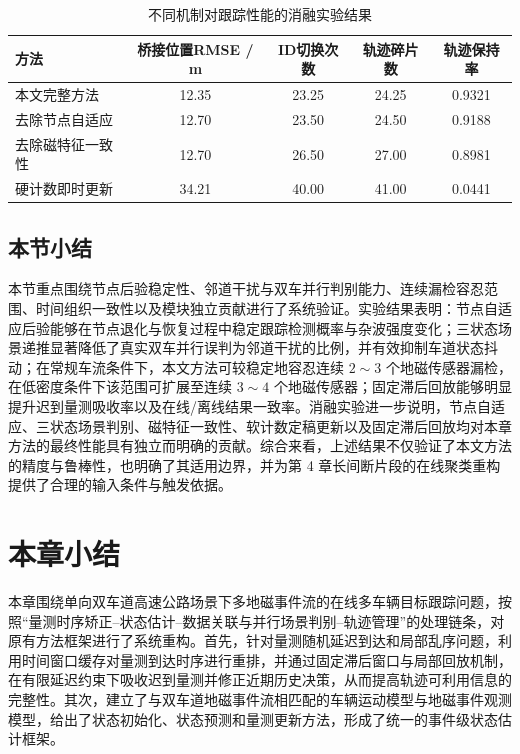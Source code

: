 \documentclass{xdupgthesis}
\begin{document}
\begin{table}[htbp]
	\centering
	\caption{不同机制对跟踪性能的消融实验结果}
	\label{tab:ablation_tracking}
	\begin{tabular}{lcccc}
		\toprule
		方法 & 桥接位置RMSE / m & ID切换次数 & 轨迹碎片数 & 轨迹保持率 \\
		\midrule
		本文完整方法      & 12.35 & 23.25 & 24.25 & 0.9321 \\
		去除节点自适应    & 12.70 & 23.50 & 24.50 & 0.9188 \\
		去除磁特征一致性    & 12.70 & 26.50 & 27.00 & 0.8981 \\
		硬计数即时更新    & 34.21 & 40.00 & 41.00 & 0.0441 \\
		\bottomrule
	\end{tabular}
\end{table}


\subsection{本节小结}

本节重点围绕节点后验稳定性、邻道干扰与双车并行判别能力、连续漏检容忍范围、时间组织一致性以及模块独立贡献进行了系统验证。实验结果表明：节点自适应后验能够在节点退化与恢复过程中稳定跟踪检测概率与杂波强度变化；三状态场景递推显著降低了真实双车并行误判为邻道干扰的比例，并有效抑制车道状态抖动；在常规车流条件下，本文方法可较稳定地容忍连续 $2\sim3$ 个地磁传感器漏检，在低密度条件下该范围可扩展至连续 $3\sim4$ 个地磁传感器；固定滞后回放能够明显提升迟到量测吸收率以及在线/离线结果一致率。消融实验进一步说明，节点自适应、三状态场景判别、磁特征一致性、软计数定稿更新以及固定滞后回放均对本章方法的最终性能具有独立而明确的贡献。综合来看，上述结果不仅验证了本文方法的精度与鲁棒性，也明确了其适用边界，并为第 4 章长间断片段的在线聚类重构提供了合理的输入条件与触发依据。


\section{本章小结}

本章围绕单向双车道高速公路场景下多地磁事件流的在线多车辆目标跟踪问题，按照“量测时序矫正--状态估计--数据关联与并行场景判别--轨迹管理”的处理链条，对原有方法框架进行了系统重构。首先，针对量测随机延迟到达和局部乱序问题，利用时间窗口缓存对量测到达时序进行重排，并通过固定滞后窗口与局部回放机制，在有限延迟约束下吸收迟到量测并修正近期历史决策，从而提高轨迹可利用信息的完整性。其次，建立了与双车道地磁事件流相匹配的车辆运动模型与地磁事件观测模型，给出了状态初始化、状态预测和量测更新方法，形成了统一的事件级状态估计框架。
\end{document}
